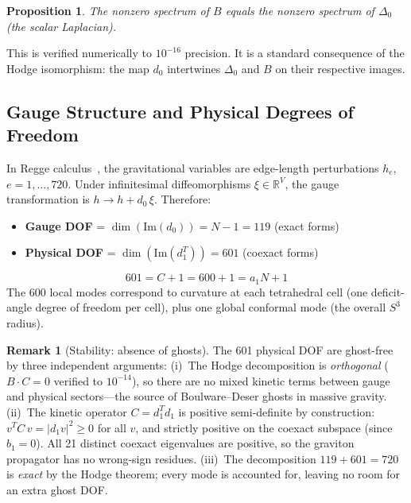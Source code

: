 \documentclass[12pt,a4paper]{article}
\newtheorem{proposition}{Proposition}
\theoremstyle{definition}
\newtheorem{remark}{Remark}
\begin{document}
\begin{proposition}
The nonzero spectrum of $B$ equals the nonzero spectrum of $\Delta_0$ (the scalar Laplacian).
\end{proposition}

This is verified numerically to $10^{-16}$ precision. It is a standard consequence of the Hodge isomorphism: the map $d_0$ intertwines $\Delta_0$ and $B$ on their respective images.

\subsection{Gauge Structure and Physical Degrees of Freedom}

In Regge calculus~\cite{regge1961}, the gravitational variables are edge-length perturbations $h_e$, $e = 1, \ldots, 720$. Under infinitesimal diffeomorphisms $\xi \in \mathbb{R}^V$, the gauge transformation is $h \to h + d_0\,\xi$. Therefore:
\begin{itemize}
\item \textbf{Gauge DOF} = $\dim(\mathrm{Im}(d_0)) = N - 1 = 119$ (exact forms)
\item \textbf{Physical DOF} = $\dim(\mathrm{Im}(d_1^T)) = 601$ (coexact forms)
\end{itemize}

\begin{equation}
\boxed{601 = C + 1 = 600 + 1 = a_1 N + 1}
\end{equation}
The 600 local modes correspond to curvature at each tetrahedral cell (one deficit-angle degree of freedom per cell), plus one global conformal mode (the overall $S^3$ radius).

\begin{remark}[Stability: absence of ghosts]
The 601 physical DOF are ghost-free by three independent arguments: (i)~The Hodge decomposition is \emph{orthogonal} ($B \cdot C = 0$ verified to $10^{-14}$), so there are no mixed kinetic terms between gauge and physical sectors---the source of Boulware--Deser ghosts in massive gravity. (ii)~The kinetic operator $C = d_1^T d_1$ is positive semi-definite by construction: $v^T C\, v = |d_1 v|^2 \geq 0$ for all $v$, and strictly positive on the coexact subspace (since $b_1 = 0$). All 21 distinct coexact eigenvalues are positive, so the graviton propagator has no wrong-sign residues. (iii)~The decomposition $119 + 601 = 720$ is \emph{exact} by the Hodge theorem; every mode is accounted for, leaving no room for an extra ghost DOF.
\end{remark}
\end{document}
